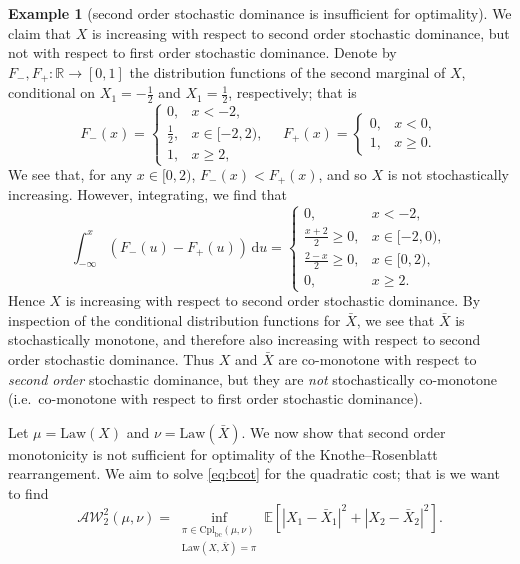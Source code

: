 \documentclass[onseside, final]{amsart}
\theoremstyle{definition}
\newtheorem{example}[theorem]{Example}
\newcommand{\R}{\mathbb R}
\newcommand{\E}{\mathbb E}
\newcommand{\Law}{\mathrm{Law}}
\newcommand{\D}{\,\mathrm{d}}
\newcommand{\AW}{\mathcal A\mathcal W}
\newcommand{\cpl}{\mathrm{Cpl}}
\newcommand{\cplba}{\cpl_{\mathrm{bc}}}
\numberwithin{equation}{section}
\begin{document}
\begin{example}[second order stochastic dominance is insufficient for optimality]
			We claim that $X$ is increasing with respect to second order stochastic dominance, but not with respect to first order stochastic dominance. Denote by $F_-, F_+\colon \R \to [0, 1]$ the distribution functions of the second marginal of $X$, conditional on $X_1 = -\frac12$ and $X_1 = \frac12$, respectively; that is
			\begin{equation}
				F_-(x) =
				\begin{cases}
					0, & x < -2,\\
					\frac12, & x \in [-2, 2),\\
					1, & x \geq 2,
				\end{cases}
				\quad
				F_+(x) =
				\begin{cases}
					0, & x < 0,\\
					1, & x \ge 0.
				\end{cases}
			\end{equation}
			We see that, for any $x \in [0, 2)$, $F_-(x) < F_+(x)$, and so $X$ is not stochastically increasing. However, integrating, we find that 
			\begin{equation}
				\int_{-\infty}^x(F_-(u) - F_+(u))\D u =
				\begin{cases}
					0, & x < -2,\\
					\frac{x + 2}{2} \ge 0 , & x \in [-2, 0),\\
					\frac{2 - x}{2} \ge 0 , & x \in [0, 2),\\
					0, & x \geq 2.
				\end{cases}
			\end{equation}
			Hence $X$ is increasing with respect to second order stochastic dominance. By inspection of the conditional distribution functions for $\bar X$, we see that $\bar X$ is stochastically monotone, and therefore also increasing with respect to second order stochastic dominance.
			Thus $X$ and $\bar X$ are co-monotone with respect to \emph{second order} stochastic dominance, but they are \emph{not} stochastically co-monotone (i.e.~co-monotone with respect to first order stochastic dominance).
			
			Let $\mu = \Law(X)$ and $\nu = \Law(\bar X)$. We now show that second order monotonicity is not sufficient for optimality of the Knothe--Rosenblatt rearrangement.
			We aim to solve \eqref{eq:bcot} for the quadratic cost; that is we want to find
			\begin{equation}
				\AW_2^2(\mu, \nu) = \inf_{\substack{\pi \in \cplba(\mu, \nu)\\\Law(X, \bar X) = \pi}} \E\!\left[|X_1 - \bar X_1|^2 + |X_2 - \bar X_2|^2\right]\!.
			\end{equation}
			

\end{example}
\end{document}
